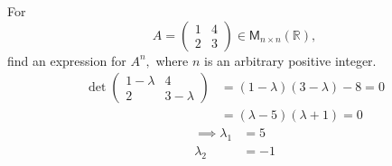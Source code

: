 For 
\[
A = \begin{pmatrix}
1 & 4 \\
2 & 3
\end{pmatrix} \in \mathsf{M}_{n\times n}(\mathbb{R}),
\]
find an expression for $A^n,$ where $n$ is an arbitrary positive
integer.
\begin{align}
\det{\begin{pmatrix}
1 - \lambda & 4\\
2 & 3-\lambda 
\end{pmatrix}
} &= (1-\lambda)(3-\lambda)-8 = 0\\
&= (\lambda-5)(\lambda+1) = 0 
\end{align}
\begin{align}
\implies \lambda_1 &= 5\\
\lambda_2 &= -1
\end{align}
